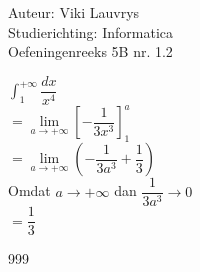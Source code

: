 \documentclass[a4paper]{article}
\begin{document}
  
\noindent \large Auteur: Viki	Lauvrys \\
\noindent \large Studierichting: Informatica\\
\noindent \large Oefeningenreeks 5B nr. 1.2\\

\medskip

\normalsize

$ \displaystyle\int^{+\infty}_{1} \dfrac{dx}{x^4}$\\

$ = \lim\limits_{a \rightarrow +\infty} \left[ -\dfrac{1}{3x^3} \right]^{a}_{1} $ \\

$ = \lim\limits_{a \rightarrow +\infty}\left( -\dfrac{1}{3a^3} + \dfrac{1}{3} \right) $ \\

Omdat $ a \rightarrow +\infty $ dan $ \dfrac{1}{3a^3} \rightarrow 0 $ \\

$ = \dfrac{1}{3} $\\

\begin{thebibliography}{999}
\end{thebibliography}
\end{document}
